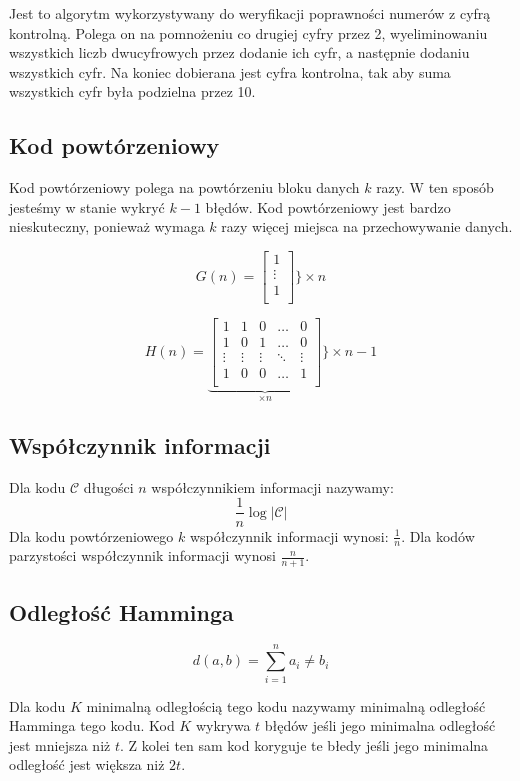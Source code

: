 \documentclass{../notatki}
\begin{document}
Jest to algorytm wykorzystywany do weryfikacji poprawności numerów z cyfrą
kontrolną. Polega on na pomnożeniu co drugiej cyfry przez 2, wyeliminowaniu
wszystkich liczb dwucyfrowych przez dodanie ich cyfr, a następnie
dodaniu wszystkich cyfr. Na koniec dobierana jest cyfra kontrolna, tak aby
suma wszystkich cyfr była podzielna przez 10.

\subsection{Kod powtórzeniowy}

Kod powtórzeniowy polega na powtórzeniu bloku danych $k$ razy. W ten sposób
jesteśmy w stanie wykryć $k-1$ błędów. Kod powtórzeniowy jest bardzo
nieskuteczny, ponieważ wymaga $k$ razy więcej miejsca na przechowywanie
danych.

$$
G(n) =
\begin{bmatrix}
1 \\
\vdots \\
1 \\
\end{bmatrix}
\Bigg \} \times n
$$

$$
H(n) =
\underbrace{
\begin{bmatrix}
1 & 1 & 0 & \dots & 0 \\
1 & 0 & 1 & \dots & 0 \\
\vdots & \vdots & \vdots & \ddots & \vdots \\
1 & 0 & 0 & \dots & 1 \\
\end{bmatrix}
}_{\times n}
\Bigg \} \times n - 1
$$

\subsection{Współczynnik informacji}

Dla kodu $\mathcal{C}$ długości $n$ współczynnikiem informacji nazywamy:
$$
\frac{1}{n}\log|\mathcal{C}|
$$
Dla kodu powtórzeniowego $k$ współczynnik informacji wynosi: $\frac{1}{n}$.
Dla kodów parzystości współczynnik informacji wynosi $\frac{n}{n+1}$.

\subsection{Odległość Hamminga}

$$
d(a, b) = \sum_{i = 1}^{n} a_i \ne b_i
$$

Dla kodu $K$ minimalną odległością tego kodu nazywamy minimalną odległość
Hamminga tego kodu. Kod $K$ wykrywa $t$ błędów jeśli jego minimalna odległość
jest mniejsza niż $t$. Z kolei ten sam kod koryguje te błedy jeśli jego
minimalna odległość jest większa niż $2t$.
\end{document}
